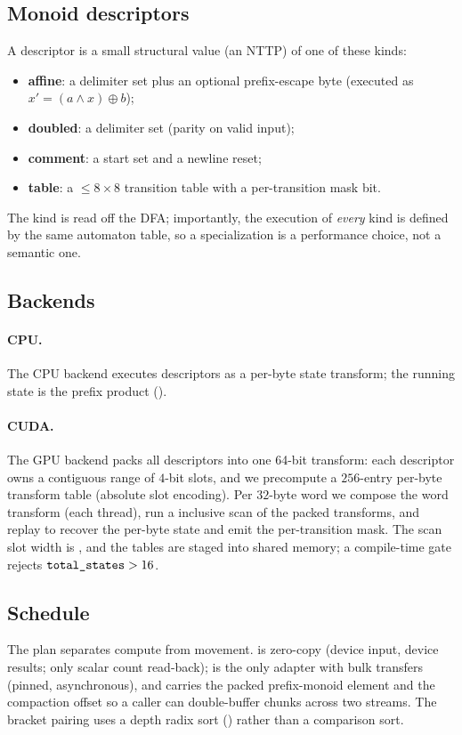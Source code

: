 \subsection{Monoid descriptors}
\label{sec:descriptor}

A descriptor is a small structural value (an NTTP) of one of these kinds:
\begin{itemize}
  \item \textbf{affine}: a delimiter set plus an optional prefix-escape byte
    (executed as $x'=(a\wedge x)\oplus b$);
  \item \textbf{doubled}: a delimiter set (parity on valid input);
  \item \textbf{comment}: a start set and a newline reset;
  \item \textbf{table}: a $\le 8\times 8$ transition table with a
    per-transition mask bit.
\end{itemize}
The kind is read off the DFA; importantly, the execution of \emph{every} kind is
defined by the same automaton table, so a specialization is a performance choice,
not a semantic one.

\subsection{Backends}
\label{sec:backend}

\paragraph{CPU.}
The CPU backend executes descriptors as a per-byte state transform; the running
state is the prefix product (\Rfour).

\paragraph{CUDA.}
The GPU backend packs all descriptors into one 64-bit transform: each descriptor
owns a contiguous range of $4$-bit slots, and we precompute a $256$-entry
per-byte transform table (absolute slot encoding).  Per $32$-byte word we compose
the word transform (each thread), run a  inclusive scan of the
packed transforms, and replay to recover the per-byte state and emit the
per-transition mask.  The scan slot width is , and the tables
are staged into shared memory; a compile-time gate rejects
$\texttt{total\_states}>16$.

\subsection{Schedule}
\label{sec:schedule}

The plan separates compute from movement.   is zero-copy
(device input, device results; only scalar count read-back); 
is the only adapter with bulk transfers (pinned, asynchronous), and
 carries the packed prefix-monoid element and the compaction
offset so a caller can double-buffer chunks across two streams.  The bracket
pairing uses a depth radix sort (\Rsix) rather than a comparison sort.
